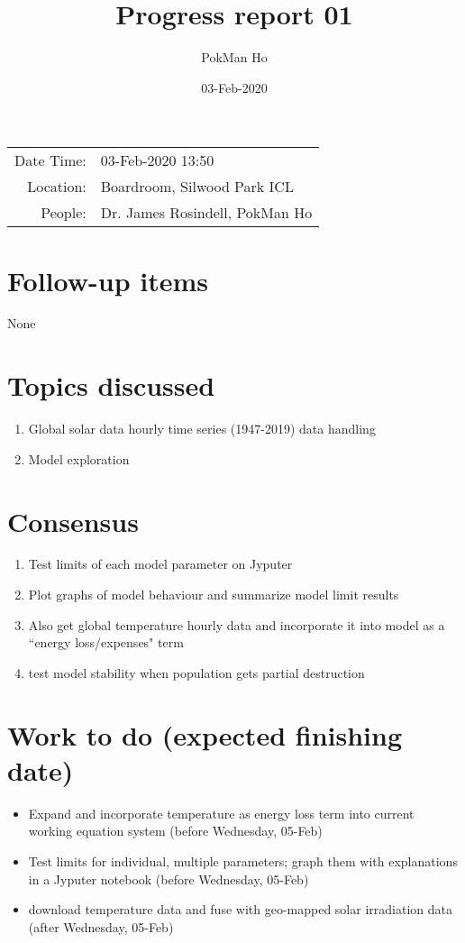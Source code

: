 \documentclass[a4paper,11pt]{article}
\title{Progress report 01}
\author{PokMan Ho}
\date{03-Feb-2020}
\begin{document}
    \maketitle
    
    \begin{tabular}{rl}
        Date Time: & 03-Feb-2020 13:50 \\
        Location: & Boardroom, Silwood Park ICL \\
        People: & Dr. James Rosindell, PokMan Ho \\
    \end{tabular}
    \section{Follow-up items}
    None
    \section{Topics discussed}
    \begin{enumerate}
        \item Global solar data hourly time series (1947-2019) data handling
        \item Model exploration
    \end{enumerate}
    \section{Consensus}
    \begin{enumerate}
        \item Test limits of each model parameter on Jyputer
        \item Plot graphs of model behaviour and summarize model limit results
        \item Also get global temperature hourly data and incorporate it into model as a ``energy loss/expenses" term
        \item test model stability when population gets partial destruction
    \end{enumerate}
    \section{Work to do (expected finishing date)}
    \begin{itemize}
        \item Expand and incorporate temperature as energy loss term into current working equation system (before Wednesday, 05-Feb)
        \item Test limits for individual, multiple parameters; graph them with explanations in a Jyputer notebook (before Wednesday, 05-Feb)
        \item download temperature data and fuse with geo-mapped solar irradiation data (after Wednesday, 05-Feb)
    \end{itemize}
\end{document}
